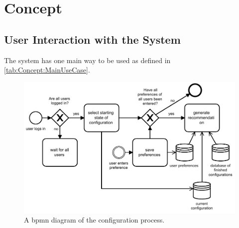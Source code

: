 \chapter{Concept}
\label{ch:Concept}

\section{User Interaction with the System}
\label{sec:Concept:UserSystemInteraction}

The system has one main way to be used as defined in \autoref{tab:Concept:MainUseCase}.

\begin{figure}
    \centering
    \includegraphics[width=1\textwidth]{./figures/bpmn_configuration_process_with_continious_recommendation.pdf}
    \caption{A bpmn diagram of the configuration process.}
    \label{fig:Concept:ConfigurationProcess}
\end{figure}

